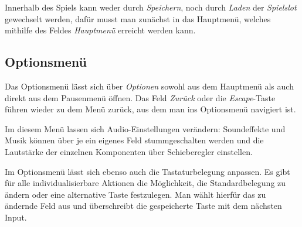 Innerhalb des Spiels kann weder durch \textit{Speichern}, noch durch
\textit{Laden} der \textit{Spielslot} gewechselt werden, dafür musst man
zunächst in das Hauptmenü, welches mithilfe des Feldes \textit{Hauptmenü}
erreicht werden kann.

\subsection{Optionsmenü}\label{sec:menu-options}

Das Optionsmenü lässt sich über \textit{Optionen} sowohl aus dem Hauptmenü als
auch direkt aus dem Pausenmenü öffnen. Das Feld \textit{Zurück} oder die
\textit{Escape}-Taste führen wieder zu dem Menü zurück, aus dem man ins
Optionsmenü navigiert ist.

Im diesem Menü lassen sich Audio-Einstellungen verändern: Soundeffekte und
Musik können über je ein eigenes Feld stummgeschalten werden und die Lautstärke
der einzelnen Komponenten über Schieberegler einstellen.

Im Optionsmenü lässt sich ebenso auch die Tastaturbelegung anpassen. Es gibt
für alle individualisierbare Aktionen die Möglichkeit, die Standardbelegung zu
ändern oder eine alternative Taste festzulegen. Man wählt hierfür das zu
ändernde Feld aus und überschreibt die gespeicherte Taste mit dem nächsten
Input.
